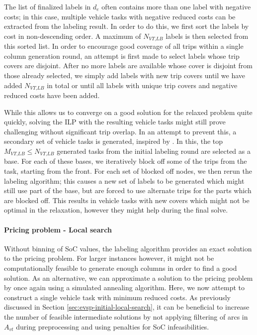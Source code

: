 \documentclass[]{article}
\begin{document}
The list of finalized labels in $d_e$ often contains more than one label with negative costs; in this case, multiple vehicle tasks with negative reduced costs can be extracted from the labeling result. In order to do this, we first sort the labels by cost in non-descending order. A maximum of $N_{\textit{VT,LB}}$ labels is then selected from this sorted list. In order to encourage good coverage of all trips within a single column generation round, an attempt is first made to select labels whose trip covers are disjoint. After no more labels are available whose cover is disjoint from those already selected, we simply add labels with new trip covers until we have added $N_{\textit{VT,LB}}$ in total or until all labels with unique trip covers and negative reduced costs have been added. 

While this allows us to converge on a good solution for the relaxed problem quite quickly, solving the ILP with the resulting vehicle tasks might still prove challenging without significant trip overlap. In an attempt to prevent this, a secondary set of vehicle tasks is generated, inspired by \cite{Guido2009}. In this, the top $M_{\textit{VT,LB}} \leq N_{\textit{VT,LB}}$ generated tasks from the initial labeling round are selected as a base. For each of these bases, we iteratively block off some of the trips from the task, starting from the front. For each set of blocked off nodes, we then rerun the labeling algorithm; this causes a new set of labels to be generated which might still use part of the base, but are forced to use alternate trips for the parts which are blocked off. This results in vehicle tasks with new covers which might not be optimal in the relaxation, however they might help during the final solve.

\paragraph{Pricing problem - Local search} \label{sec:evsp-pricing-local-search}
Without binning of SoC values, the labeling algorithm provides an exact solution to the pricing problem. For larger instances however, it might not be computationally feasible to generate enough columns in order to find a good solution. As an alternative, we can approximate a solution to the pricing problem by once again using a simulated annealing algorithm. Here, we now attempt to construct a single vehicle task with minimum reduced costs. As previously discussed in Section \ref{sec:evsp-initial-local-search}, it can be beneficial to increase the number of feasible intermediate solutions by not applying filtering of arcs in $A_{vt}$ during preprocessing and using penalties for SoC infeasibilities.
\end{document}
